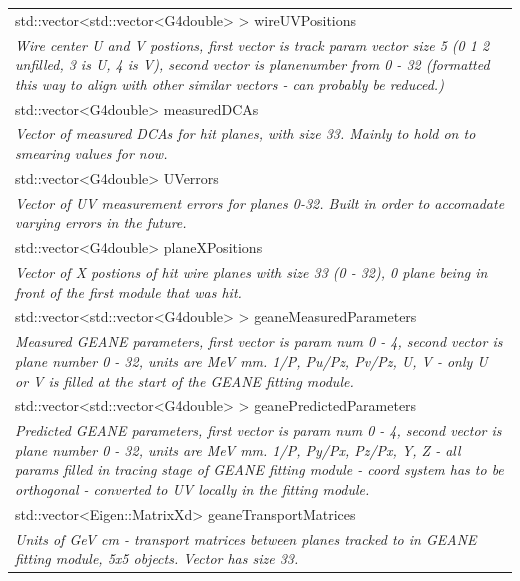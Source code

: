 \documentclass{article}
\begin{document}
\begin{longtable}{|p{16cm}|}
std::vector\textless{}std::vector\textless{}G4double\textgreater{} \textgreater{} wireUVPositions \\
\textit{Wire center U and V postions, first vector is track param vector size 5 (0 1 2 unfilled, 3 is U, 4 is V), second vector is planenumber from 0 - 32  (formatted this way to align with other similar vectors - can probably be reduced.)} \\ \hline

std::vector\textless{}G4double\textgreater{} measuredDCAs \\
\textit{Vector of measured DCAs for hit planes, with size 33. Mainly to hold on to smearing values for now.} \\ \hline

std::vector\textless{}G4double\textgreater{} UVerrors \\
\textit{Vector of UV measurement errors for planes 0-32. Built in order to accomadate varying errors in the future.} \\ \hline

std::vector\textless{}G4double\textgreater{} planeXPositions \\
\textit{Vector of X postions of hit wire planes with size 33 (0 - 32), 0 plane being in front of the first module that was hit.} \\ \hline

std::vector\textless{}std::vector\textless{}G4double\textgreater{} \textgreater{} geaneMeasuredParameters \\
\textit{Measured GEANE parameters, first vector is param num 0 - 4, second vector is plane number 0 - 32, units are MeV mm. 1/P, Pu/Pz, Pv/Pz, U, V - only U or V is filled at the start of the GEANE fitting module.} \\ \hline

std::vector\textless{}std::vector\textless{}G4double\textgreater{} \textgreater{} geanePredictedParameters \\ 
\textit{Predicted GEANE parameters, first vector is param num 0 - 4, second vector is plane number 0 - 32, units are MeV mm. 1/P, Py/Px, Pz/Px, Y, Z - all params filled in tracing stage of GEANE fitting module - coord system has to be orthogonal - converted to UV locally in the fitting module.} \\ \hline

std::vector\textless{}Eigen::MatrixXd\textgreater{} geaneTransportMatrices \\
\textit{Units of GeV cm - transport matrices between planes tracked to in GEANE fitting module, 5x5 objects. Vector has size 33.} \\ \hline


\end{longtable}
\end{document}
